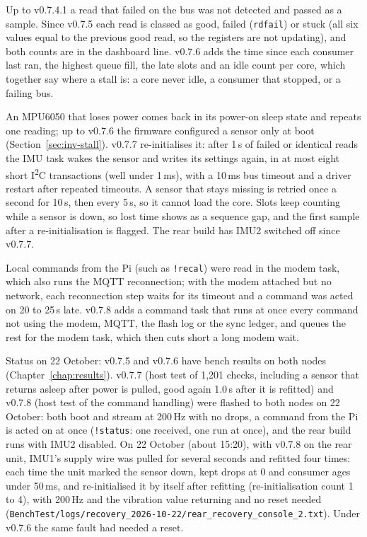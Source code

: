 Up to v0.7.4.1 a read that failed on the bus was not detected and passed as a sample. Since v0.7.5 each read is classed as good, failed (\texttt{rdfail}) or stuck (all six values equal to the previous good read, so the registers are not updating), and both counts are in the dashboard line. v0.7.6 adds the time since each consumer last ran, the highest queue fill, the late slots and an idle count per core, which together say where a stall is: a core never idle, a consumer that stopped, or a failing bus.

An MPU6050 that loses power comes back in its power-on sleep state and repeats one reading; up to v0.7.6 the firmware configured a sensor only at boot (Section~\ref{sec:inv-stall}). v0.7.7 re-initialises it: after 1\,s of failed or identical reads the IMU task wakes the sensor and writes its settings again, in at most eight short I\textsuperscript{2}C transactions (well under 1\,ms), with a 10\,ms bus timeout and a driver restart after repeated timeouts. A sensor that stays missing is retried once a second for 10\,s, then every 5\,s, so it cannot load the core. Slots keep counting while a sensor is down, so lost time shows as a sequence gap, and the first sample after a re-initialisation is flagged. The rear build has IMU2 switched off since v0.7.7.

Local commands from the Pi (such as \texttt{!recal}) were read in the modem task, which also runs the MQTT reconnection; with the modem attached but no network, each reconnection step waits for its timeout and a command was acted on 20 to 25\,s late. v0.7.8 adds a command task that runs at once every command not using the modem, MQTT, the flash log or the sync ledger, and queues the rest for the modem task, which then cuts short a long modem wait.

Status on 22 October: v0.7.5 and v0.7.6 have bench results on both nodes (Chapter~\ref{chap:results}). v0.7.7 (host test of 1,201 checks, including a sensor that returns asleep after power is pulled, good again 1.0\,s after it is refitted) and v0.7.8 (host test of the command handling) were flashed to both nodes on 22 October: both boot and stream at 200\,Hz with no drops, a command from the Pi is acted on at once (\texttt{!status}: one received, one run at once), and the rear build runs with IMU2 disabled. On 22 October (about 15:20), with v0.7.8 on the rear unit, IMU1's supply wire was pulled for several seconds and refitted four times: each time the unit marked the sensor down, kept drops at 0 and consumer ages under 50\,ms, and re-initialised it by itself after refitting (re-initialisation count 1 to 4), with 200\,Hz and the vibration value returning and no reset needed (\texttt{BenchTest/\allowbreak{}logs/\allowbreak{}recovery\_\allowbreak{}2026-10-22/\allowbreak{}rear\_\allowbreak{}recovery\_\allowbreak{}console\_\allowbreak{}2.txt}). Under v0.7.6 the same fault had needed a reset.

